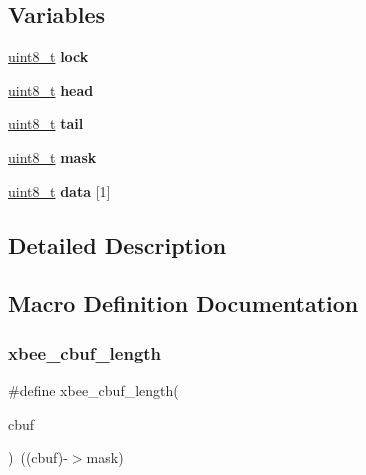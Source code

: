 \subsection*{Variables}
\begin{DoxyCompactItemize}
\item 
\mbox{\label{group__util__cbuf_ga92435efb84d6814afd444fd462802e9c}} 
\hyperlink{group__hal__dos_gae1affc9ca37cfb624959c866a73f83c2}{uint8\+\_\+t} {\bfseries lock}
\item 
\mbox{\label{group__util__cbuf_ga9794c0e61506b826b49b458708ae2489}} 
\hyperlink{group__hal__dos_gae1affc9ca37cfb624959c866a73f83c2}{uint8\+\_\+t} {\bfseries head}
\item 
\mbox{\label{group__util__cbuf_ga8db7f977b77e4e4d588ef0d3e04ada16}} 
\hyperlink{group__hal__dos_gae1affc9ca37cfb624959c866a73f83c2}{uint8\+\_\+t} {\bfseries tail}
\item 
\mbox{\label{group__util__cbuf_ga8a74907784be6c7786c2d060c8d7e10b}} 
\hyperlink{group__hal__dos_gae1affc9ca37cfb624959c866a73f83c2}{uint8\+\_\+t} {\bfseries mask}
\item 
\mbox{\label{group__util__cbuf_gaa86e1085c6a16f60258f29c9d5fc2144}} 
\hyperlink{group__hal__dos_gae1affc9ca37cfb624959c866a73f83c2}{uint8\+\_\+t} {\bfseries data} \mbox{[}1\mbox{]}
\end{DoxyCompactItemize}


\subsection{Detailed Description}


\subsection{Macro Definition Documentation}
\mbox{\label{group__util__cbuf_gaa3f9edea3274c2d62f09768c38fe6a1d}} 
\subsubsection{\texorpdfstring{xbee\+\_\+cbuf\+\_\+length}{xbee\_cbuf\_length}}
{\footnotesize\ttfamily \#define xbee\+\_\+cbuf\+\_\+length(\begin{DoxyParamCaption}\item[{}]{cbuf }\end{DoxyParamCaption})~((cbuf)-\/$>$mask)}



